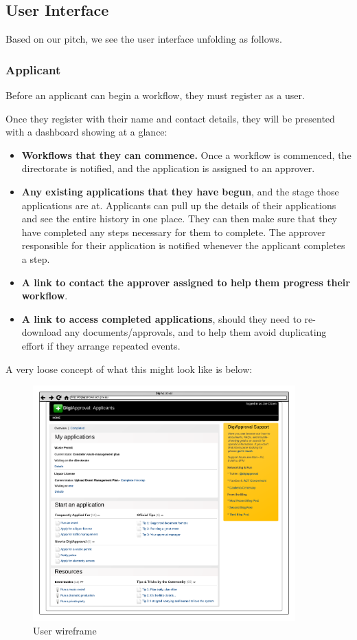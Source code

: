 \documentclass[12pt,a4paper,twosided]{article}
\begin{document}
\subsection{User Interface}

Based on our pitch, we see the user interface unfolding as follows.

\subsubsection{Applicant}

Before an applicant can begin a workflow, they must register as a user.

Once they register with their name and contact details, they will be
presented with a dashboard showing at a glance:

\begin{itemize}
\itemsep1pt\parskip0pt
\item
  \textbf{Workflows that they can commence.} Once a workflow is
  commenced, the directorate is notified, and the application is
  assigned to an approver.
\item
  \textbf{Any existing applications that they have begun}, and the stage
  those applications are at. Applicants can pull up the details of their
  applications and see the entire history in one place. They can then
  make sure that they have completed any steps necessary for them to
  complete. The approver responsible for their application is notified
  whenever the applicant completes a step.
\item
  \textbf{A link to contact the approver assigned to help them progress
  their workflow}.
\item
  \textbf{A link to access completed applications}, should they need to
  re-download any documents/approvals, and to help them avoid
  duplicating effort if they arrange repeated events.
\end{itemize}

A very loose concept of what this might look like is below:

\begin{figure}[htbp]
\centering
\includegraphics [width=0.9\textwidth]{./imgs/user-wireframe.png}
\caption{User wireframe}
\end{figure}
\end{document}
